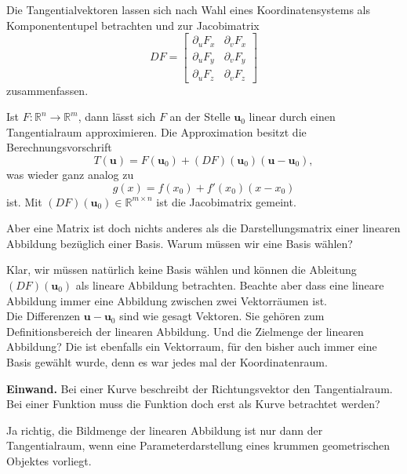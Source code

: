 \documentclass[9pt]{beamer}
\newcommand{\R}{\mathbb R}
\begin{document}
\begin{frame}
Die Tangentialvektoren lassen sich nach Wahl eines
Koordinatensystems als Komponententupel betrachten und
zur Jacobimatrix
\[DF = \begin{bmatrix}
\partial_u F_x & \partial_v F_x\\
\partial_u F_y & \partial_v F_y\\
\partial_u F_z & \partial_v F_z
\end{bmatrix}\]
zusammenfassen.
\end{frame}

\begin{frame}
Ist $F\colon\R^n\to\R^m$, dann lässt sich $F$ an der Stelle
$\mathbf u_0$ linear durch einen Tangentialraum approximieren.
Die Approximation besitzt die Berechnungsvorschrift
\[T(\mathbf u) = F(\mathbf u_0)+(DF)(\mathbf u_0)(\mathbf u-\mathbf u_0),\]
was wieder ganz analog zu
\[g(x) = f(x_0)+f'(x_0)(x-x_0)\]
ist. Mit $(DF)(\mathbf u_0)\in\R^{m\times n}$ ist die Jacobimatrix
gemeint.
\end{frame}

\begin{frame}
Aber eine Matrix ist doch nichts anderes als die Darstellungsmatrix
einer linearen Abbildung bezüglich einer Basis. Warum müssen wir eine
Basis wählen?
\end{frame}

\begin{frame}
Klar, wir müssen natürlich keine Basis wählen und können die
Ableitung $(DF)(\mathbf u_0)$ als lineare Abbildung betrachten. Beachte aber
dass eine lineare Abbildung immer eine Abbildung zwischen zwei
Vektorräumen ist.\\[1em]
Die Differenzen $\mathbf u-\mathbf u_0$ sind wie gesagt Vektoren.
Sie gehören zum Definitionsbereich der linearen Abbildung. Und die
Zielmenge der linearen Abbildung? Die ist ebenfalls ein Vektorraum,
für den bisher auch immer eine Basis gewählt wurde, denn es war
jedes mal der Koordinatenraum.
\end{frame}

\begin{frame}
\textbf{Einwand.} Bei einer Kurve beschreibt der Richtungsvektor
den Tangentialraum. Bei einer Funktion muss die Funktion doch
erst als Kurve betrachtet werden?
\end{frame}

\begin{frame}
Ja richtig, die Bildmenge der linearen Abbildung ist nur dann
der Tangentialraum, wenn eine Parameterdarstellung eines krummen
geometrischen Objektes vorliegt.
\end{frame}
\end{document}
